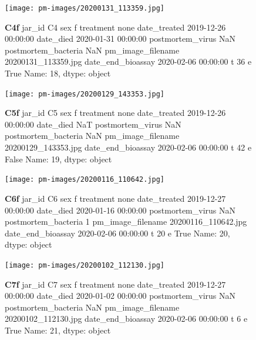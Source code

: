 \begin{figure}[h!]
\centering
\texttt{[image: pm-images/20200131\_113359.jpg]}
\caption{\textbf{C4f} jar\_id                                  C4
sex                                      f
treatment                             none
date\_treated           2019-12-26 00:00:00
date\_died              2020-01-31 00:00:00
postmortem\_virus                       NaN
postmortem\_bacteria                    NaN
pm\_image\_filename      20200131\_113359.jpg
date\_end\_bioassay      2020-02-06 00:00:00
t                                       36
e                                     True
Name: 18, dtype: object}
\end{figure}
\clearpage

\begin{figure}[h!]
\centering
\texttt{[image: pm-images/20200129\_143353.jpg]}
\caption{\textbf{C5f} jar\_id                                  C5
sex                                      f
treatment                             none
date\_treated           2019-12-26 00:00:00
date\_died                              NaT
postmortem\_virus                       NaN
postmortem\_bacteria                    NaN
pm\_image\_filename      20200129\_143353.jpg
date\_end\_bioassay      2020-02-06 00:00:00
t                                       42
e                                    False
Name: 19, dtype: object}
\end{figure}
\clearpage

\begin{figure}[h!]
\centering
\texttt{[image: pm-images/20200116\_110642.jpg]}
\caption{\textbf{C6f} jar\_id                                  C6
sex                                      f
treatment                             none
date\_treated           2019-12-27 00:00:00
date\_died              2020-01-16 00:00:00
postmortem\_virus                       NaN
postmortem\_bacteria                      1
pm\_image\_filename      20200116\_110642.jpg
date\_end\_bioassay      2020-02-06 00:00:00
t                                       20
e                                     True
Name: 20, dtype: object}
\end{figure}
\clearpage

\begin{figure}[h!]
\centering
\texttt{[image: pm-images/20200102\_112130.jpg]}
\caption{\textbf{C7f} jar\_id                                  C7
sex                                      f
treatment                             none
date\_treated           2019-12-27 00:00:00
date\_died              2020-01-02 00:00:00
postmortem\_virus                       NaN
postmortem\_bacteria                    NaN
pm\_image\_filename      20200102\_112130.jpg
date\_end\_bioassay      2020-02-06 00:00:00
t                                        6
e                                     True
Name: 21, dtype: object}
\end{figure}
\clearpage

